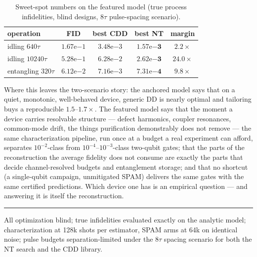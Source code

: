 \documentclass[10pt]{article}
\begin{document}
\begin{table}[h!]
\centering\small
\begin{tabular}{lcccc}
\toprule
operation & FID & best CDD & best NT & margin \\
\midrule
idling $640\tau$ & $1.67\mathrm{e}{-1}$ & $3.48\mathrm{e}{-3}$ & $\mathbf{1.57\mathrm{e}{-3}}$ & $2.2\times$ \\
idling $10240\tau$ & $5.28\mathrm{e}{-1}$ & $6.28\mathrm{e}{-2}$ & $\mathbf{2.62\mathrm{e}{-3}}$ & $24.0\times$ \\
entangling $320\tau$ & $6.12\mathrm{e}{-2}$ & $7.16\mathrm{e}{-3}$ & $\mathbf{7.31\mathrm{e}{-4}}$ & $9.8\times$ \\
\bottomrule
\end{tabular}
\caption{Sweet-spot numbers on the featured model (true process
infidelities, blind designs, $8\tau$ pulse-spacing scenario).}
\label{tab:sweet}
\end{table}

\vspace{0.3em}
Where this leaves the two-scenario story: the anchored model says that on a
quiet, monotonic, well-behaved device, generic DD is nearly optimal and
tailoring buys a reproducible $1.5$--$1.7\times$. The featured model says
that the moment a device carries resolvable structure --- defect harmonics,
coupler resonances, common-mode drift, the things purification demonstrably
does not remove --- the same characterization pipeline, run once at a budget
a real experiment can afford, separates $10^{-2}$-class from
$10^{-4}$--$10^{-3}$-class two-qubit gates; that the parts of the reconstruction
the average fidelity does not consume are exactly the parts that decide
channel-resolved budgets and entanglement storage; and that no shortcut (a
single-qubit campaign, unmitigated SPAM) delivers the same gates with the
same certified predictions. Which device one has is an empirical question
--- and answering it is itself the reconstruction.

\vspace{0.4em}
\hrule
\vspace{0.3em}
{\footnotesize All optimization blind; true infidelities evaluated exactly
on the analytic model; characterization at 128k shots per estimator, SPAM
arms at 64k on identical noise; pulse budgets separation-limited under the
$8\tau$ spacing scenario for both the NT search and the CDD library.}
\end{document}
